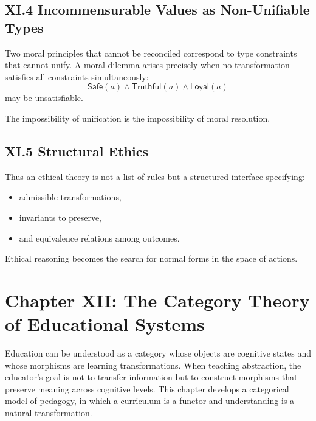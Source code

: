 \documentclass[12pt,letterpaper]{article}
\begin{document}
\subsection{XI.4 Incommensurable Values as Non-Unifiable Types}

Two moral principles that cannot be reconciled correspond to type constraints that cannot unify. A moral dilemma arises precisely when no transformation satisfies all constraints simultaneously:
\[
\mathsf{Safe}(a) \land \mathsf{Truthful}(a) \land \mathsf{Loyal}(a)
\]
may be unsatisfiable.

The impossibility of unification is the impossibility of moral resolution.

\subsection{XI.5 Structural Ethics}

Thus an ethical theory is not a list of rules but a structured interface specifying:
\begin{itemize}
    \item admissible transformations,
    \item invariants to preserve,
    \item and equivalence relations among outcomes.
\end{itemize}

Ethical reasoning becomes the search for normal forms in the space of actions.

\newpage

\section{Chapter XII: The Category Theory of Educational Systems}

Education can be understood as a category whose objects are cognitive states and whose morphisms are learning transformations. When teaching abstraction, the educator’s goal is not to transfer information but to construct morphisms that preserve meaning across cognitive levels. This chapter develops a categorical model of pedagogy, in which a curriculum is a functor and understanding is a natural transformation.
\end{document}
